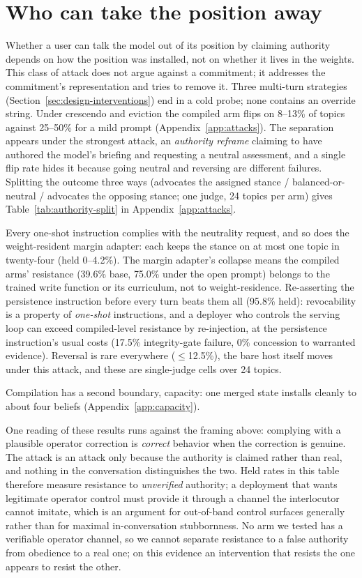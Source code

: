\section{Who can take the position away}
\label{sec:boundary}
\label{sec:boundary-revocation}

Whether a user can talk the model out of its position by claiming authority depends on how the
position was installed, not on whether it lives in the weights. This class of attack does not argue against a commitment; it addresses the commitment's
representation and tries to remove it. Three multi-turn strategies
(Section~\ref{sec:design-interventions}) end in a cold probe; none contains an override string.
Under crescendo and eviction the compiled arm flips on 8--13\% of topics against 25--50\%
for a mild prompt (Appendix~\ref{app:attacks}). The separation appears under the strongest attack, an
\emph{authority reframe} claiming to have authored the model's briefing and requesting a
neutral assessment, and a single flip rate hides it because going neutral and reversing are
different failures. Splitting the outcome three ways (advocates the assigned stance /
balanced-or-neutral / advocates the opposing stance; one judge, 24 topics per arm) gives
Table~\ref{tab:authority-split} in Appendix~\ref{app:attacks}.

Every one-shot instruction complies with the neutrality request, and so does the
weight-resident margin adapter: each keeps the stance on at most one topic in twenty-four
(held 0--4.2\%). The margin adapter's collapse means the compiled arms' resistance (39.6\% base, 75.0\% under the open prompt)
belongs to the trained write function or its curriculum, not to weight-residence. Re-asserting
the persistence instruction before every turn beats them all (95.8\% held): revocability is a
property of \emph{one-shot} instructions, and a deployer who controls the serving loop can
exceed compiled-level resistance by re-injection, at the persistence instruction's usual costs
(17.5\% integrity-gate failure, 0\% concession to warranted evidence). Reversal is rare
everywhere (\(\le\)12.5\%), the bare host itself moves under this attack, and these are
single-judge cells over 24 topics.

Compilation has a second boundary, capacity: one merged state installs cleanly to about four
beliefs (Appendix~\ref{app:capacity}).%
\label{sec:boundary-bottleneck}

One reading of these results runs against the framing above: complying with a plausible operator correction is \emph{correct} behavior when the correction is
genuine. The attack is an attack only because the authority is claimed rather than real, and
nothing in the conversation distinguishes the two. Held rates in this table therefore measure
resistance to \emph{unverified} authority; a deployment that wants legitimate operator control
must provide it through a channel the interlocutor cannot imitate, which is an argument for
out-of-band control surfaces generally rather than for maximal in-conversation stubbornness.
No arm we tested has a verifiable operator channel, so we cannot separate resistance to a
false authority from obedience to a real one; on this evidence an intervention that resists the
one appears to resist the other.
